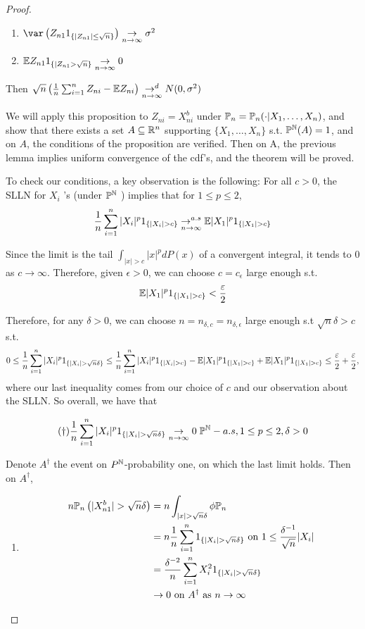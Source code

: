 \documentclass[a4paper]{article}
\begin{document}
\begin{proof}
\begin{prop}
\begin{enumerate}
			\item $\var\left( Z_{n1} 1_{\{|Z_{n1}| \le \sqrt{n} \}}  \right) \underset{n\to \infty}{\to } \sigma^2$

			\item $\E Z_{n1} 1_{\{|Z_{n1} > \sqrt{n} \}} \underset{n\to \infty}{\to } 0$
		\end{enumerate}

		Then $\sqrt{n} \left( \frac{1}{n} \sum_{i=1}^{n} Z_{ni} - \E Z_{ni} \right) \underset{n\to \infty}{\to ^{d}} N(0, \sigma^2)$
	\end{prop}

	We will apply this proposition to $Z_{ni} = X_{ni}^{b}$ under $\P_n = \P_{n}(\cdot |X_1,\ldots,X_n)$, and show that there exists a set $A \subseteq \R^{n}$ supporting $\{X_1,\ldots,X_n\} $ s.t. $\P^{\N}(A) = 1$, and on $A$, the conditions of the proposition are verified. Then on A, the previous lemma implies uniform convergence of the cdf's, and the theorem will be proved.

	To check our conditions, a key observation is the following: For all $c>0$, the SLLN for $X_i$ 's (under $\P^{\N}$ ) implies that for $1\le p\le 2$,
	\[
	\frac{1}{n}\sum_{i=1}^{n}|X_i|^{p} 1_{\{|X_i| > c\} } \underset{n\to \infty}{\to^{a.s} } \E |X_1|^{p} 1_{\{|X_1| > c\} }
	\]

	Since the limit is the tail $\int_{|x|>c} |x|^{p} dP(x)$ of a convergent integral, it tends to $0$ as $c\to \infty$. Therefore, given $\epsilon >0$, we can choose $c = c_{\epsilon}$ large enough s.t. 
	\[
	\E |X_1|^{p} 1_{\{|X_1| > c\} } < \frac{\epsilon}{2}
	\]

	Therefore, for any $\delta > 0$, we can choose $n = n_{\delta, c} = n_{\delta, \epsilon}$ large enough s.t $\sqrt{n} \delta > c$ s.t.
	\[
	0 \le \frac{1}{n} \sum_{i=1}^{n}|X_i|^{p} 1_{\{|X_i| > \sqrt{n}\delta \} } \le \frac{1}{n} \sum_{i=1}^{n} |X_i|^{p} 1_{\{|X_i| > c\} } - \E |X_1|^{p}1_{\{|X_1| > c\} } + \E |X_1|^{p}1_{\{|X_1| > c\} } \le  \frac{\epsilon}{2} + \frac{\epsilon}{2}
,\]
where our last inequality comes from our choice of $c$ and our observation about the SLLN. So overall, we have that

\[
	(\dagger) \frac{1}{n}\sum_{i=1}^{n}|X_i|^{p} 1_{\{|X_i| > \sqrt{n} \delta\} } \underset{n\to \infty}{\to } 0 \; \P^{\N}-a.s, 1\le p\le 2, \delta > 0
\]

Denote $A^{\dagger}$ the event on $P^{\N}$-probability one, on which the last limit holds. Then on $A^{\dagger}$,

\begin{enumerate}
	\item \begin{align*}
		n \P_n \left( |X_{n1}^{b}| > \sqrt{n} \delta \right) &= n \int_{|x|> \sqrt{n} \delta} \phi \P_n  \\
		&= n \frac{1}{n} \sum_{i=1}^{n} 1_{\{ |X_i| > \sqrt{n} \delta\} } \text{ on } 1\le \frac{\delta^{-1}}{\sqrt{n} } |X_i| \\
		&= \frac{\delta^{-2}}{n} \sum_{i=1}^{n} X_i^2 1_{\{|X_i| > \sqrt{n} \delta\} } \\
		&\to 0 \text{ on } A^{\dagger} \text{ as } n\to \infty
		\end{align*}


\end{enumerate}
\end{proof}
\end{document}
